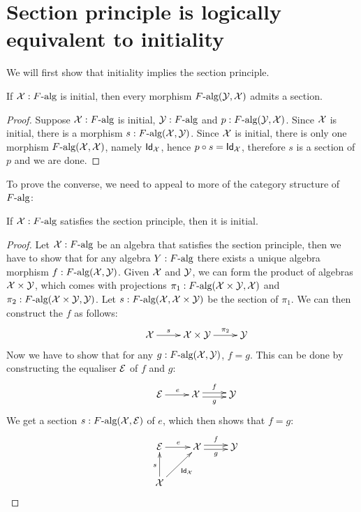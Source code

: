 \documentclass[a4paper,10pt]{report}
\begin{document}
\section{Section principle is logically equivalent to initiality}
\label{sec:oitsectioninitiality}

We will first show that initiality implies the section principle.

\begin{prop}
  If $\mathcal{X} : F\mbox{-alg}$ is initial, then every morphism
  $F\mbox{-alg}(\mathcal{Y},\mathcal{X})$ admits a section.
\end{prop}

\begin{proof}
  Suppose $\mathcal{X} : F\mbox{-alg}$ is initial, $\mathcal{Y} : F\mbox{-alg}$
  and $p : F\mbox{-alg}(\mathcal{Y},\mathcal{X})$. Since $\mathcal{X}$ is initial,
  there is a morphism $s : F\mbox{-alg}(\mathcal{X},\mathcal{Y})$. Since
  $\mathcal{X}$ is initial, there is only one morphism
  $F\mbox{-alg}(\mathcal{X},\mathcal{X})$, namely $\mathsf{Id}_{\mathcal{X}}$, hence
  $p \circ s = \mathsf{Id}_{\mathcal{X}}$, therefore $s$ is a section of $p$ and we
  are done.
\end{proof}

To prove the converse, we need to appeal to more of the category
structure of $F\mbox{-alg}$:

\begin{prop}
  If $\mathcal{X} : F\mbox{-alg}$ satisfies the section principle, then it
  is initial.
\end{prop}

\begin{proof}
  Let $\mathcal{X} : F\mbox{-alg}$ be an algebra that satisfies the section
  principle, then we have to show that for any algebra
  $Y : F\mbox{-alg}$ there exists a unique algebra morphism
  $f : F\mbox{-alg}(\mathcal{X},\mathcal{Y})$. Given $\mathcal{X}$ and $\mathcal{Y}$, we
  can form the product of algebras $\mathcal{X} \times \mathcal{Y}$, which
  comes with projections
  $\pi_1 : F\mbox{-alg}(\mathcal{X} \times \mathcal{Y}, \mathcal{X})$ and
  $\pi_2 : F\mbox{-alg}(\mathcal{X} \times \mathcal{Y}, \mathcal{Y})$. Let
  $s : F\mbox{-alg}(\mathcal{X},\mathcal{X} \times \mathcal{Y})$ be the section of
  $\pi_1$. We can then construct the $f$ as follows:
$$
\xymatrix{ &\alg{X} \ar[r]^-{s} &\alg{X} \times \alg{Y}
  \ar[r]^-{\pi_2} &\alg{Y} }
$$
Now we have to show that for any $g : F\mbox{-alg}(\mathcal{X},\mathcal{Y})$,
$f = g$. This can be done by constructing the equaliser $\mathcal{E}$ of
$f$ and $g$:
$$
\xymatrix{ &\alg{E} \ar[r]^{e} &\alg{X} \ar@<-.5ex>[r]_-{g}
  \ar@<.5ex>[r]^-{f} &\alg{Y} }
$$
We get a section $s : F\mbox{-alg}(\mathcal{X},\mathcal{E})$ of $e$, which then
shows that $f = g$:
$$
\xymatrix{
  &\alg{E} \ar[r]^{e} &\alg{X} \ar@<-.5ex>[r]_-{g} \ar@<.5ex>[r]^-{f} &\alg{Y} \\
  &\alg{X} \ar[u]^{s} \ar[ur]_{\Id{\alg{X}}} }
$$
\end{proof}
\end{document}
